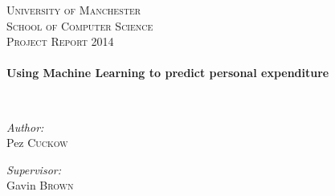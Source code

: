 \begin{titlepage}
\begin{center}

\textsc{\LARGE University of Manchester}\\[1.5cm]
\textsc{\Large School of Computer Science\\Project Report 2014}\\[0.5cm]

\HRule \\[0.4cm]
{ \huge \bfseries Using Machine Learning to predict personal expenditure \\[0.4cm] }

\HRule \\[1.5cm]

\begin{minipage}{0.4\textwidth}
\begin{flushleft} \large
\emph{Author:}\\
Pez \textsc{Cuckow}
\end{flushleft}
\end{minipage}
\begin{minipage}{0.4\textwidth}
\begin{flushright} \large
\emph{Supervisor:} \\
Gavin \textsc{Brown}
\end{flushright}
\end{minipage}

\vfill


\end{center}
\end{titlepage}